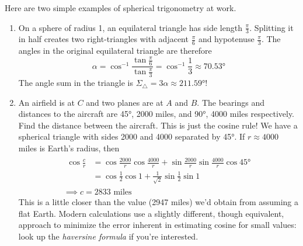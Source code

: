 \begin{examples*}{}{}
	Here are two simple examples of spherical trigonometry at work.
	\begin{enumerate}
		\item On a sphere of radius 1, an equilateral triangle has side length $\frac\pi 3$. Splitting it in half creates two right-triangles with adjacent $\frac\pi 6$ and hypotenuse $\frac\pi 3$. The angles in the original equilateral triangle are therefore
		\[
			\alpha=\cos^{-1}\frac{\tan\frac\pi 6}{\tan\frac\pi 3}=\cos^{-1}\frac 13\approx \ang{70.53}
		\]
		The angle sum in the triangle is $\Sigma_{\triangle}=3\alpha\approx\ang{211.59}$!
		
		\item An airfield is at $C$ and two planes are at $A$ and $B$. The bearings and distances to the aircraft are \ang{45}, 2000 miles, and \ang{90}, 4000 miles respectively. Find the distance between the aircraft.\smallbreak
		This is just the cosine rule! We have a spherical triangle with sides 2000 and 4000 separated by \ang{45}. If $r\approx 4000$ miles is Earth's radius, then
		\begin{gather*}
			\begin{aligned}
				\cos\frac cr &=\cos\frac{2000}r\cos\frac{4000}r+\sin\frac{2000}r\sin\frac{4000}r\cos\ang{45}\\
				&=\cos\frac 12\cos 1+\frac 1{\sqrt 2}\sin\frac 12\sin 1
			\end{aligned}\\
			\implies c=2833\text{ miles}
		\end{gather*}
		This is a little closer than the value (2947 miles) we'd obtain from assuming a flat Earth.\smallbreak
		Modern calculations use a slightly different, though equivalent, approach to minimize the error inherent in estimating cosine for small values: look up the \emph{haversine formula} if you're interested.
	\end{enumerate}
\end{examples*}




